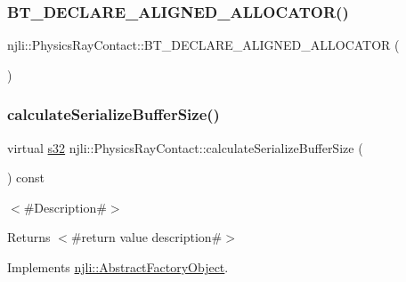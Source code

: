 \subsubsection{\texorpdfstring{B\+T\+\_\+\+D\+E\+C\+L\+A\+R\+E\+\_\+\+A\+L\+I\+G\+N\+E\+D\+\_\+\+A\+L\+L\+O\+C\+A\+T\+O\+R()}{BT\_DECLARE\_ALIGNED\_ALLOCATOR()}}
{\footnotesize\ttfamily njli\+::\+Physics\+Ray\+Contact\+::\+B\+T\+\_\+\+D\+E\+C\+L\+A\+R\+E\+\_\+\+A\+L\+I\+G\+N\+E\+D\+\_\+\+A\+L\+L\+O\+C\+A\+T\+OR (\begin{DoxyParamCaption}{ }\end{DoxyParamCaption})\hspace{0.3cm}{\ttfamily [protected]}}

\mbox{\label{classnjli_1_1_physics_ray_contact_a137ae28469554d1e1a9f932fdb3f808f}} 
\subsubsection{\texorpdfstring{calculate\+Serialize\+Buffer\+Size()}{calculateSerializeBufferSize()}}
{\footnotesize\ttfamily virtual \mbox{\hyperlink{_util_8h_aa62c75d314a0d1f37f79c4b73b2292e2}{s32}} njli\+::\+Physics\+Ray\+Contact\+::calculate\+Serialize\+Buffer\+Size (\begin{DoxyParamCaption}{ }\end{DoxyParamCaption}) const\hspace{0.3cm}{\ttfamily [virtual]}}

$<$\#\+Description\#$>$

\begin{DoxyReturn}{Returns}
$<$\#return value description\#$>$ 
\end{DoxyReturn}


Implements \mbox{\hyperlink{classnjli_1_1_abstract_factory_object_a4763d05bc9dc37c559111f8bb30e1dd8}{njli\+::\+Abstract\+Factory\+Object}}.

\mbox{\label{classnjli_1_1_physics_ray_contact_a438e26cf68a5d260f2fc3b6d23acd387}} 
